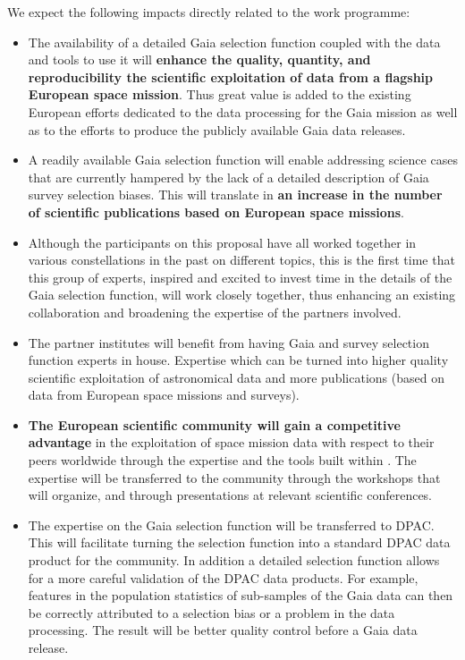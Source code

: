We expect the following impacts directly related to the work programme:
\begin{itemize}
    \item The availability of a detailed Gaia selection function coupled with the data and tools to use it will \textbf{enhance the quality, quantity, and reproducibility the scientific exploitation of data from a flagship European space mission}. Thus great value is added to the existing European efforts dedicated to the data processing for the Gaia mission as well as to the efforts to produce the publicly available Gaia data releases.
    \item A readily available Gaia selection function will enable addressing science cases that are currently hampered by the lack of a detailed description of Gaia survey selection biases. This will translate in \textbf{an increase in the number of scientific publications based on European space missions}.
    \item Although the participants on this proposal have all worked together in various constellations in the past on different topics, this is the first time that this group of experts, inspired and excited to invest time in the details of the Gaia selection function, will work closely together, thus enhancing an existing collaboration and broadening the expertise of the partners involved.
    \item The partner institutes will benefit from having Gaia and survey selection function experts in house. Expertise which can be turned into higher quality scientific exploitation of astronomical data and more publications (based on data from European space missions and surveys).
    \item \textbf{The European scientific community will gain a competitive advantage} in the exploitation of space mission data with respect to their peers worldwide through the expertise and the tools built within {\acro}. The expertise will be transferred to the community through the workshops that {\acro} will organize, and through presentations at relevant scientific conferences.
    \item The expertise on the Gaia selection function will be transferred to DPAC. This will facilitate turning the selection function into a standard DPAC data product for the community. In addition a detailed selection function allows for a more careful validation of the DPAC data products. For example, features in the population statistics of sub-samples of the Gaia data can then be correctly attributed to a selection bias or a problem in the data processing. The result will be better quality control before a Gaia data release.

\end{itemize}
